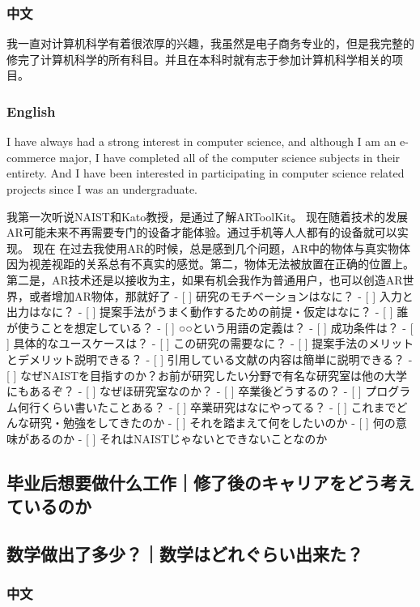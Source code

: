 \documentclass[lang=cn,11pt,a4paper]{elegantpaper}
\begin{document}
\subsubsection{中文}
我一直对计算机科学有着很浓厚的兴趣，我虽然是电子商务专业的，但是我完整的修完了计算机科学的所有科目。并且在本科时就有志于参加计算机科学相关的项目。
\subsubsection{English}
I have always had a strong interest in computer science, and although I am an e-commerce major, I have completed all of the computer science subjects in their entirety. And I have been interested in participating in computer science related projects since I was an undergraduate.


我第一次听说NAIST和Kato教授，是通过了解ARToolKit。
现在随着技术的发展AR可能未来不再需要专门的设备才能体验。通过手机等人人都有的设备就可以实现。
现在
在过去我使用AR的时候，总是感到几个问题，AR中的物体与真实物体因为视差视距的关系总有不真实的感觉。第二，物体无法被放置在正确的位置上。第二是，AR技术还是以接收为主，如果有机会我作为普通用户，也可以创造AR世界，或者增加AR物体，那就好了
- [ ]  研究のモチベーションはなに？
- [ ]  入力と出力はなに？
- [ ]  提案手法がうまく動作するための前提・仮定はなに？
- [ ]  誰が使うことを想定している？
- [ ]  ○○という用語の定義は？
- [ ]  成功条件は？
- [ ]  具体的なユースケースは？
- [ ]  この研究の需要なに？
- [ ]  提案手法のメリットとデメリット説明できる？
- [ ]  引用している文献の内容は簡単に説明できる？
- [ ]  なぜNAISTを目指すのか？お前が研究したい分野で有名な研究室は他の大学にもあるぞ？
- [ ]  なぜほ研究室なのか？
- [ ]  卒業後どうするの？
- [ ]  プログラム何行くらい書いたことある？
- [ ]  卒業研究はなにやってる？
- [ ]  これまでどんな研究・勉強をしてきたのか
- [ ]  それを踏まえて何をしたいのか
- [ ]  何の意味があるのか
- [ ]  それはNAISTじゃないとできないことなのか

\subsection{毕业后想要做什么工作｜修了後のキャリアをどう考えているのか}
\subsection{数学做出了多少？｜数学はどれぐらい出来た？}
\subsubsection{中文}
\end{document}
